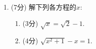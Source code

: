 \documentclass[12pt]{article}
\begin{document}
\begin{enumerate}
        \hrulefill

        \hrulefill

        \hrulefill

        \hrulefill

        \hrulefill

        \hrulefill

        \hrulefill

        \hrulefill

        \hrulefill

        \hrulefill

        \hrulefill

        \hrulefill

        \hrulefill

        \hrulefill

        \hrulefill

        \hrulefill

        \hrulefill

        \hrulefill

        \hrulefill

        \hrulefill
        \item (7分) 解下列各方程的$x$:\begin{enumerate}
            \item (3分) $\sqrt{x}=\sqrt{2}-1$.
            \item (4分) $\sqrt{x^2+1}-x=1$.
        \end{enumerate}

        \hrulefill

        \hrulefill

        \hrulefill

        \hrulefill

        \hrulefill

        \hrulefill

        \hrulefill

        \hrulefill

        \hrulefill

        \hrulefill

        \hrulefill

        \hrulefill

        \hrulefill

        \hrulefill

        \hrulefill

        \hrulefill

        \hrulefill

        \hrulefill


\end{enumerate}
\end{document}
